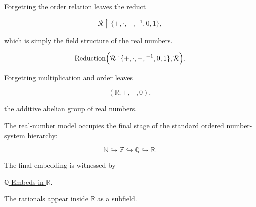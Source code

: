 
\begin{remark*}

Forgetting the order relation leaves the reduct

\[
\mathcal R
\!\restriction\!
\{+,\cdot,-,{}^{-1},0,1\},
\]

which is simply the field structure of the real numbers.

\[
\operatorname{Reduction}
\Bigl(
\mathcal R
\!\restriction\!
\{+,\cdot,-,{}^{-1},0,1\},
\mathcal R
\Bigr).
\]

\end{remark*}


\begin{remark*}

Forgetting multiplication and order leaves

\[
(\mathbb R;+,-,0),
\]

the additive abelian group of real numbers.

\end{remark*}


\begin{remark*}

The real-number model occupies the final stage of the standard ordered
number-system hierarchy:

\[
\mathbb N
\hookrightarrow
\mathbb Z
\hookrightarrow
\mathbb Q
\hookrightarrow
\mathbb R.
\]

The final embedding is witnessed by

\hyperref[thm:q-embeds-in-r]
{$\mathbb Q$ Embeds in $\mathbb R$}.

The rationals appear inside $\mathbb R$ as a subfield.

\end{remark*}


